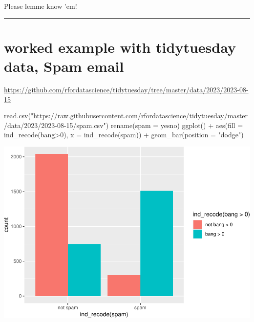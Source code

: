 Please lemme know 'em!

\begin{center}\rule{0.5\linewidth}{0.5pt}\end{center}

\hypertarget{worked-example-with-tidytuesday-data-spam-email}{%
\section{worked example with tidytuesday data, Spam
email}\label{worked-example-with-tidytuesday-data-spam-email}}

\url{https://github.com/rfordatascience/tidytuesday/tree/master/data/2023/2023-08-15}

\begin{Schunk}
\begin{Sinput}
read.csv("https://raw.githubusercontent.com/rfordatascience/tidytuesday/master/data/2023/2023-08-15/spam.csv") %
  rename(spam = yesno) %
  ggplot() + 
  aes(fill = ind_recode(bang>0), x = ind_recode(spam)) + 
  geom_bar(position = "dodge")
\end{Sinput}

\includegraphics[width=0.69\linewidth]{r_journal_files/figure-latex/unnamed-chunk-19-1} 
\end{Schunk}
